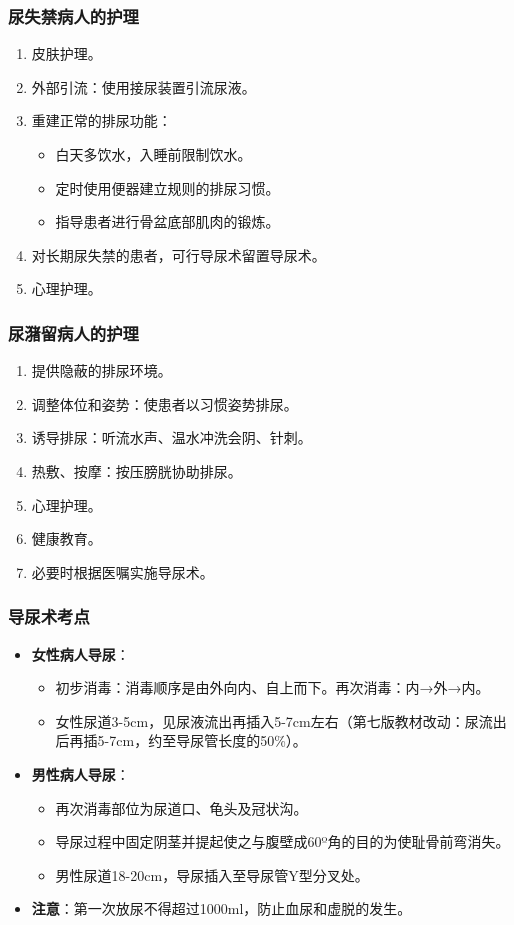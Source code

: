 \documentclass[11pt, a4paper]{ctexart}
\begin{document}
\subsubsection{尿失禁病人的护理}
\begin{enumerate}
	\item 皮肤护理。
	\item 外部引流：使用接尿装置引流尿液。
	\item 重建正常的排尿功能：
	      \begin{itemize}
		      \item 白天多饮水，入睡前限制饮水。
		      \item 定时使用便器建立规则的排尿习惯。
		      \item 指导患者进行骨盆底部肌肉的锻炼。
	      \end{itemize}
	\item 对长期尿失禁的患者，可行导尿术留置导尿术。
	\item 心理护理。
\end{enumerate}

\subsubsection{尿潴留病人的护理}
\begin{enumerate}
	\item 提供隐蔽的排尿环境。
	\item 调整体位和姿势：使患者以习惯姿势排尿。
	\item 诱导排尿：听流水声、温水冲洗会阴、针刺。
	\item 热敷、按摩：按压膀胱协助排尿。
	\item 心理护理。
	\item 健康教育。
	\item 必要时根据医嘱实施导尿术。
\end{enumerate}

\subsubsection{导尿术考点}
\begin{itemize}
	\item \textbf{女性病人导尿}：
	      \begin{itemize}
		      \item 初步消毒：消毒顺序是由外向内、自上而下。再次消毒：内→外→内。
		      \item 女性尿道3-5cm，见尿液流出再插入5-7cm左右（第七版教材改动：尿流出后再插5-7cm，约至导尿管长度的50\%）。
	      \end{itemize}
	\item \textbf{男性病人导尿}：
	      \begin{itemize}
		      \item 再次消毒部位为尿道口、龟头及冠状沟。
		      \item 导尿过程中固定阴茎并提起使之与腹壁成60º角的目的为使耻骨前弯消失。
		      \item 男性尿道18-20cm，导尿插入至导尿管Y型分叉处。
	      \end{itemize}
	\item \textbf{注意}：第一次放尿不得超过1000ml，防止血尿和虚脱的发生。
\end{itemize}
\end{document}

